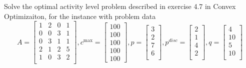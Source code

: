 \begin{prob}[3.2]
  Solve the optimal activity level problem described in exercise 4.7 in Convex
  Optimizaiton, for the instance with problem data
  \[
  A = \begin{bmatrix}
    1 & 2 & 0 & 1\\
    0 & 0 & 3 & 1\\
    0 & 3 & 1 & 1\\
    2 & 1 & 2 & 5\\
    1 & 0 & 3 & 2\\
  \end{bmatrix},
  c^{\max} = \begin{bmatrix}
    100\\
    100\\
    100\\
    100\\
    100
  \end{bmatrix},
  p = \begin{bmatrix}
    3\\
    2\\
    7\\
    6\\
  \end{bmatrix},
  p^{disc} = \begin{bmatrix}
    2\\
    1\\
    4\\
    2\\
  \end{bmatrix},
  q = \begin{bmatrix}
    4\\
    10\\
    5\\
    10\\
  \end{bmatrix}
  \]
\end{prob}

